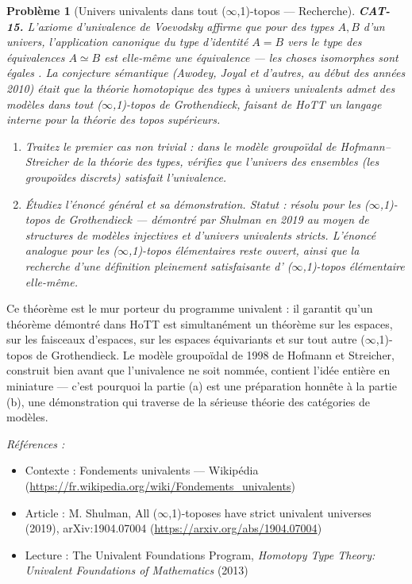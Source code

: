 \documentclass[11pt]{article}
\newtheorem{problem}{Problème}
\newenvironment{refs}{\par\small\noindent\emph{Références :}\begin{itemize}\setlength\itemsep{0pt}}{\end{itemize}\normalsize}
\begin{document}
\begin{problem}[{Univers univalents dans tout ($\infty$,1)-topos --- Recherche}]
\textbf{CAT-15.} L'axiome d'univalence de Voevodsky affirme que pour des types
$ A, B $ d'un univers, l'application canonique du type d'identité $ A = B $ vers le type
des équivalences $ A \simeq B $ est elle-même une équivalence --- \og{} les choses isomorphes sont
égales \fg{}. La conjecture sémantique (Awodey, Joyal et d'autres, au début des années 2010) était que
la théorie homotopique des types à univers univalents admet des modèles dans tout
($\infty$,1)-topos de Grothendieck, faisant de HoTT un langage interne pour la théorie des topos
supérieurs.
\begin{enumerate}
\item[(a)] Traitez le premier cas non trivial : dans le modèle groupoïdal de Hofmann--Streicher de la
théorie des types, vérifiez que l'univers des ensembles (les groupoïdes discrets) satisfait
l'univalence.
\item[(b)] Étudiez l'énoncé général et sa démonstration.
\textit{Statut : résolu pour les ($\infty$,1)-topos de Grothendieck --- démontré par Shulman en 2019 au moyen de
structures de modèles injectives et d'univers univalents stricts. L'énoncé analogue pour les
($\infty$,1)-topos élémentaires reste ouvert, ainsi que la recherche d'une définition pleinement
satisfaisante d'\og{} ($\infty$,1)-topos élémentaire \fg{} elle-même.}
\end{enumerate}

\end{problem}

\noindent Ce théorème est le mur porteur du programme univalent : il garantit qu'un
théorème démontré dans HoTT est simultanément un théorème sur les espaces, sur les faisceaux
d'espaces, sur les espaces équivariants et sur tout autre ($\infty$,1)-topos de Grothendieck. Le modèle
groupoïdal de 1998 de Hofmann et Streicher, construit bien avant que l'univalence ne soit nommée,
contient l'idée entière en miniature --- c'est pourquoi la partie (a) est une préparation honnête à
la partie (b), une démonstration qui traverse de la sérieuse théorie des catégories de modèles.

\begin{refs}
\item Contexte : Fondements univalents --- Wikipédia (\url{https://fr.wikipedia.org/wiki/Fondements_univalents})
\item Article : M. Shulman, \og{} All ($\infty$,1)-toposes have strict univalent universes \fg{} (2019), arXiv:1904.07004 (\url{https://arxiv.org/abs/1904.07004})
\item Lecture : The Univalent Foundations Program, \textit{Homotopy Type Theory: Univalent Foundations of Mathematics} (2013)
\end{refs}
\end{document}
